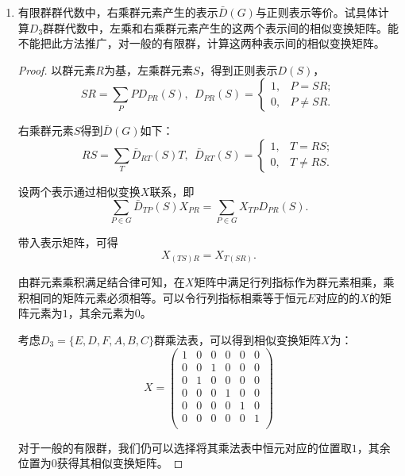 \documentclass[reqno,a4paper,12pt]{amsart}
\begin{document}
\begin{enumerate}[1.]
\begin{proof}
\begin{enumerate}[(1)]
\item $\mathbf{Tr} D(RS) \neq \mathbf{Tr} D(R) \mathbf{Tr} D(S)$，则$\mathbf{Tr}D(G)$不是群$G$的表示。
\end{enumerate}

\end{proof}

\medskip

\item 有限群群代数中，右乘群元素产生的表示$\bar{D}(G)$与正则表示等价。试具体计算$D_3$群群代数中，左乘和右乘群元素产生的这两个表示间的相似变换矩阵。能不能把此方法推广，对一般的有限群，计算这两种表示间的相似变换矩阵。

\begin{proof}
以群元素$R$为基，左乘群元素$S$，得到正则表示$D(S)$，
\[
	SR = \sum_P P D_{PR}(S), \ \ D_{PR}(S) = \left\{ \begin{aligned}
		1, & P = SR; \\
		0, & P \neq SR.
	\end{aligned} \right.
\]

右乘群元素$S$得到$\bar{D}(G)$如下：
\[
	RS = \sum_T \bar{D}_{RT}(S) T, \ \ \bar{D}_{RT}(S) = \left\{ \begin{aligned}
		1, & T = RS; \\
		0, & T \neq RS.
	\end{aligned} \right.
\]

设两个表示通过相似变换$X$联系，即
\[
	\sum_{P\in G} \bar{D}_{TP}(S) X_{PR} = \sum_{P\in G} X_{TP} D_{PR}(S).
\]

带入表示矩阵，可得
\[
	X_{(TS)R} = X_{T(SR)}.
\]

由群元素乘积满足结合律可知，在$X$矩阵中满足行列指标作为群元素相乘，乘积相同的矩阵元素必须相等。可以令行列指标相乘等于恒元$E$对应的的$X$的矩阵元素为$1$，其余元素为$0$。

考虑$D_3 = \{E, D, F, A, B, C\}$群乘法表，可以得到相似变换矩阵$X$为：
\[
	X = \left( \begin{matrix}
		1 & 0 & 0 & 0 & 0 & 0 \\
		0 & 0 & 1 & 0 & 0 & 0 \\
		0 & 1 & 0 & 0 & 0 & 0 \\
		0 & 0 & 0 & 1 & 0 & 0 \\
		0 & 0 & 0 & 0 & 1 & 0 \\
		0 & 0 & 0 & 0 & 0 & 1 \\
	\end{matrix} \right)
\]

对于一般的有限群，我们仍可以选择将其乘法表中恒元对应的位置取$1$，其余位置为$0$获得其相似变换矩阵。
\end{proof}


\end{enumerate}
\end{document}
